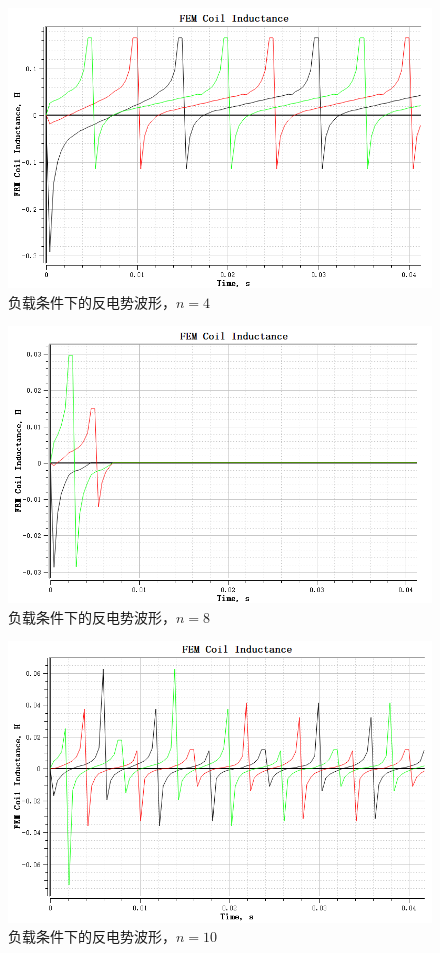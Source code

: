 \documentclass{thuemp}
\begin{document}
\begin{figure}[H]
  \centering
  \includegraphics[width=1\linewidth]{./img/task3/FEM-n4-load.png}
  \caption{负载条件下的反电势波形，$n=4$}
\end{figure}
\begin{figure}[H]
  \centering
  \includegraphics[width=1\linewidth]{./img/task3/FEM-n8-load.png}
  \caption{负载条件下的反电势波形，$n=8$}
\end{figure}
\begin{figure}[H]
  \centering
  \includegraphics[width=1\linewidth]{./img/task3/FEM-n10-load.png}
  \caption{负载条件下的反电势波形，$n=10$}
\end{figure}
\end{document}
